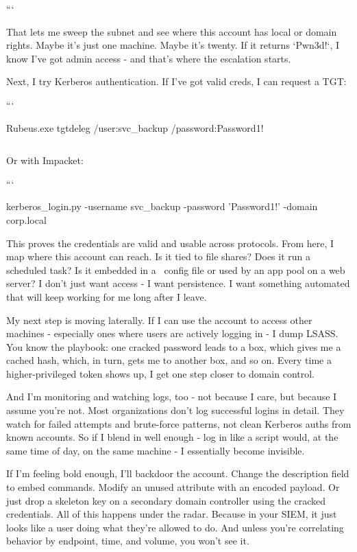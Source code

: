 ```

That lets me sweep the subnet and see where this account has local or domain rights. Maybe it’s just one machine. Maybe it’s twenty. If it returns `Pwn3d!`, I know I’ve got admin access - and that’s where the escalation starts.

Next, I try Kerberos authentication. If I’ve got valid creds, I can request a TGT:

```

Rubeus.exe tgtdeleg /user:svc\_backup /password:Password1!

\begin{verbatim}
\end{verbatim}
Or with Impacket:

```

kerberos\_login.py -username svc\_backup -password 'Password1!' -domain corp.local


This proves the credentials are valid and usable across protocols. From here, I map where this account can reach. Is it tied to file shares? Does it run a scheduled task? Is it embedded in a  config file or used by an app pool on a web server? I don’t just want access - I want persistence. I want something automated that will keep working for me long after I leave.

My next step is moving laterally. If I can use the account to access other machines - especially ones where users are actively logging in - I dump LSASS. You know the playbook: one cracked password leads to a box, which gives me a cached hash, which, in turn, gets me to another box, and so on. Every time a higher-privileged token shows up, I get one step closer to domain control.

And I’m monitoring and watching logs, too - not because I care, but because I assume you’re not. Most organizations don’t log successful logins in detail. They watch for failed attempts and brute-force patterns, not clean Kerberos auths from known accounts. So if I blend in well enough - log in like a script would, at the same time of day, on the same machine - I essentially become invisible.

If I’m feeling bold enough, I’ll backdoor the account. Change the description field to embed commands. Modify an unused attribute with an encoded payload. Or just drop a skeleton key on a secondary domain controller using the cracked credentials. All of this happens under the radar. Because in your SIEM, it just looks like a user doing what they’re allowed to do. And unless you’re correlating behavior by endpoint, time, and volume, you won’t see it.

